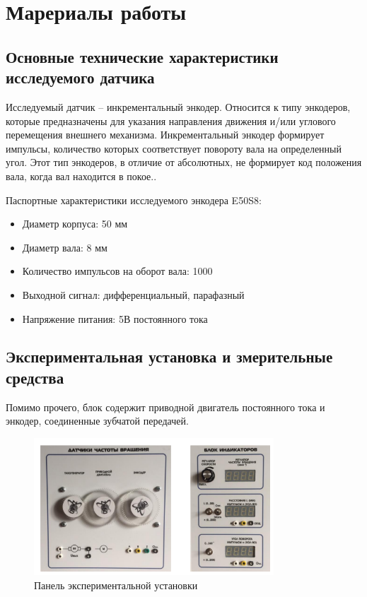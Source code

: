 \section{Марериалы работы}

\subsection{Основные технические характеристики исследуемого датчика}
Исследуемый датчик -- инкрементальный энкодер.
Относится к типу энкодеров, которые предназначены для указания направления движения и/или углового перемещения внешнего механизма.
Инкрементальный энкодер формирует импульсы, количество которых соответствует повороту вала на определенный угол.
Этот тип энкодеров, в отличие от абсолютных, не формирует код положения вала, когда вал находится в покое..

Паспортные характеристики исследуемого энкодера E50S8:
\begin{itemize}
    \item Диаметр корпуса: 50 мм
    \item Диаметр вала: 8 мм
    \item Количество импульсов на оборот вала: 1000
    \item Выходной сигнал: дифференциальный, парафазный
    \item Напряжение питания: 5В постоянного тока
\end{itemize}

\subsection{Экспериментальная установка и змерительные средства}
Помимо прочего, блок содержит приводной двигатель постоянного тока и энкодер, соединенные зубчатой передачей.
\begin{figure}[!h]
    \centering
    \includegraphics[width=0.8\textwidth]{img/Screenshot_20221002_213647}
    \caption{Панель экспериментальной установки}
    \label{fig:Screenshot_20221002_213647}
\end{figure}

